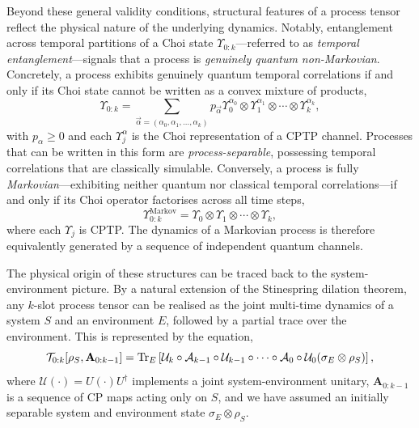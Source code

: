 Beyond these general validity conditions, structural features of a process tensor reflect the physical nature of the underlying dynamics. Notably, entanglement across temporal partitions of a Choi state \(\Upsilon_{0:k}\)---referred to as \emph{temporal entanglement}---signals that a process is \emph{genuinely quantum non-Markovian}. Concretely, a process exhibits genuinely quantum temporal correlations if and only if its Choi state cannot be written as a convex mixture of products, 
\begin{equation}\label{eq:process-separable}
\Upsilon_{0:k} = \sum_{\vec{\alpha} = (\alpha_0, \alpha_1, \dots, \alpha_k)} p_{\vec{\alpha}} \Upsilon_0^{\alpha_0} \otimes \Upsilon_1^{\alpha_1} \otimes \cdots \otimes \Upsilon_k^{\alpha_k},
\end{equation}
with \(p_\alpha \geq 0\) and each \(\Upsilon_j^\alpha\) is the Choi representation of a CPTP channel. Processes that can be written in this form are \emph{process-separable}, possessing temporal correlations that are classically simulable. Conversely, a process is fully \emph{Markovian}---exhibiting neither quantum nor classical temporal correlations---if and only if its Choi operator factorises across all time steps,
\begin{equation}\label{eq:markovian-process}
    \Upsilon_{0:k}^{\textrm{Markov}} = \Upsilon_0 \otimes \Upsilon_1 \otimes \cdots \otimes \Upsilon_k,
\end{equation}
where each \(\Upsilon_j\) is CPTP. The dynamics of a Markovian process is therefore equivalently generated by a sequence of independent quantum channels.

The physical origin of these structures can be traced back to the system-environment picture. By a natural extension of the Stinespring dilation theorem, any \(k\)-slot process tensor can be realised as the joint multi-time dynamics of a system \(S\) and an environment \(E\), followed by a partial trace over the environment. This is represented by the equation,
\begin{equation}
    \mathcal{T}_{0:k}[\rho_S, \mathbf{A}_{0:k-1}] = \mathrm{Tr}_E\left[\mathcal{U}_k \circ \mathcal{A}_{k-1} \circ \mathcal{U}_{k-1} \circ \dots \circ \mathcal{A}_0 \circ \mathcal{U}_0(\sigma_E\otimes\rho_S) \right],
\end{equation}
where \(\mathcal{U}(\cdot) = U(\cdot)U^\dagger\) implements a joint system-environment unitary, \(\mathbf{A}_{0:k-1}\) is a sequence of CP maps acting only on \(S\), and we have assumed an initially separable system and environment state \(\sigma_E \otimes \rho_S\).

